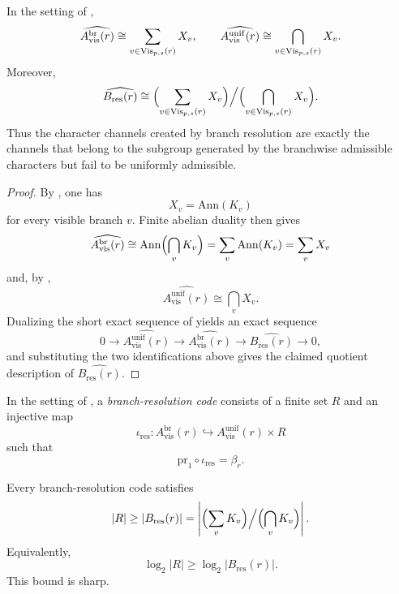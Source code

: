 \begin{corollary}\label{cor:branch-resolution-dual}
In the setting of ,
\[
\widehat{A_{\mathrm{vis}}^{\mathrm{br}}(r)}
\cong
\sum_{v\in \mathrm{Vis}_{p,s}(r)} X_v,
\qquad
\widehat{A_{\mathrm{vis}}^{\mathrm{unif}}(r)}
\cong
\bigcap_{v\in \mathrm{Vis}_{p,s}(r)} X_v.
\]
Moreover,
\[
\widehat{B_{\mathrm{res}}(r)}
\cong
\Bigl(\sum_{v\in \mathrm{Vis}_{p,s}(r)} X_v\Bigr)\Big/\Bigl(\bigcap_{v\in \mathrm{Vis}_{p,s}(r)} X_v\Bigr).
\]
Thus the character channels created by branch resolution are exactly the channels that belong to the subgroup generated by the branchwise admissible characters but fail to be uniformly admissible.
\end{corollary}

\begin{proof}
By , one has
\[
X_v=\mathrm{Ann}(K_v)
\]
for every visible branch $v$. Finite abelian duality then gives
\[
\widehat{A_{\mathrm{vis}}^{\mathrm{br}}(r)}
\cong
\mathrm{Ann}\Bigl(\bigcap_v K_v\Bigr)
=
\sum_v \mathrm{Ann}(K_v)
=
\sum_v X_v
\]
and, by ,
\[
\widehat{A_{\mathrm{vis}}^{\mathrm{unif}}(r)}
\cong
\bigcap_v X_v.
\]
Dualizing the short exact sequence of  yields an exact sequence
\[
0\longrightarrow \widehat{A_{\mathrm{vis}}^{\mathrm{unif}}(r)}
\longrightarrow \widehat{A_{\mathrm{vis}}^{\mathrm{br}}(r)}
\longrightarrow \widehat{B_{\mathrm{res}}(r)}
\longrightarrow 0,
\]
and substituting the two identifications above gives the claimed quotient description of $\widehat{B_{\mathrm{res}}(r)}$.
\end{proof}

\begin{definition}\label{def:branch-resolution-code}
In the setting of , a \emph{branch-resolution code} consists of a finite set $R$ and an injective map
\[
\iota_{\mathrm{res}}:A_{\mathrm{vis}}^{\mathrm{br}}(r)\hookrightarrow A_{\mathrm{vis}}^{\mathrm{unif}}(r)\times R
\]
such that
\[
\mathrm{pr}_1\circ \iota_{\mathrm{res}}=\beta_r.
\]
\end{definition}

\begin{proposition}\label{thm:branch-resolution-budget}
Every branch-resolution code satisfies
\[
|R|\ge |B_{\mathrm{res}}(r)|
=
\left|\Bigl(\sum_v K_v\Bigr)\Big/\Bigl(\bigcap_v K_v\Bigr)\right|.
\]
Equivalently,
\[
\log_2|R|
\ge
\log_2|B_{\mathrm{res}}(r)|.
\]
This bound is sharp.
\end{proposition}

